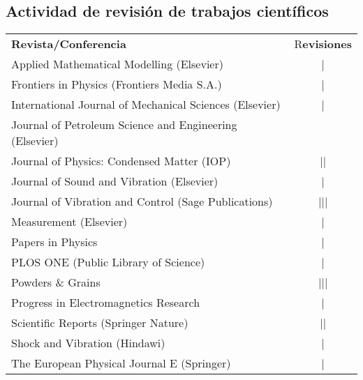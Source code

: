 \subsection{Actividad de revisión de trabajos científicos}
\begin{tabular}{l c}
    \textbf{Revista/Conferencia} & R\textbf{evisiones} \\
    Applied Mathematical Modelling (Elsevier) & | \\ 
    Frontiers in Physics (Frontiers Media S.A.) & | \\
    International Journal of Mechanical Sciences (Elsevier) & | \\
    Journal of Petroleum Science and Engineering (Elsevier) & \cancel{||||} \\
    Journal of Physics: Condensed Matter (IOP) & || \\
    Journal of Sound and Vibration (Elsevier) & \cancel{||||} | \\
    Journal of Vibration and Control (Sage Publications) & ||| \\
    Measurement (Elsevier) &  | \\
    Papers in Physics & | \\
    PLOS ONE (Public Library of Science) & | \\
    Powders \& Grains & ||| \\
    Progress in Electromagnetics Research & | \\
    Scientific Reports (Springer Nature) & || \\
    Shock and Vibration (Hindawi) &  | \\
    The European Physical Journal E (Springer) & | 
\end{tabular}

